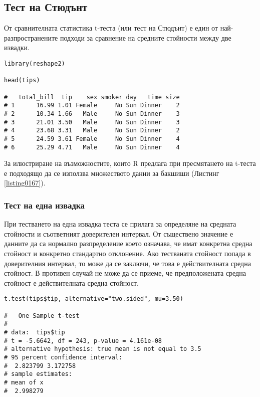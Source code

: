 \subsection{Тест на Стюдънт}

От сравнителната статистика t-теста (или тест на Стюдънт) е един от най-разпространените подходи за сравнение на средните стойности между две извадки. 

\begin{lstlisting}[caption=Тестово множество за бакшиши, label=listing0167]
library(reshape2)

head(tips)

#   total_bill  tip    sex smoker day   time size
# 1      16.99 1.01 Female     No Sun Dinner    2
# 2      10.34 1.66   Male     No Sun Dinner    3
# 3      21.01 3.50   Male     No Sun Dinner    3
# 4      23.68 3.31   Male     No Sun Dinner    2
# 5      24.59 3.61 Female     No Sun Dinner    4
# 6      25.29 4.71   Male     No Sun Dinner    4
\end{lstlisting}

За илюстриране на възможностите, които R предлага при пресмятането на t-теста е подходящо да се използва множеството данни за бакшиши (Листинг \ref{listing0167}).

\subsubsection{Тест на една извадка}

При тестването на една извадка теста се прилага за определяне на средната стойности и съответният доверителен интервал. От съществено значение е данните да са нормално разпределение което означава, че имат конкретна средна стойност и конкретно стандартно отклонение. Ако тестваната стойност попада в доверителния интервал, то може да се заключи, че това е действителната средна стойност. В противен случай не може да се приеме, че предположената средна стойност е действителната средна стойност. 

\begin{lstlisting}[caption=Тест на единична извадка, label=listing0168]
t.test(tips$tip, alternative="two.sided", mu=3.50)

# 	One Sample t-test
# 
# data:  tips$tip
# t = -5.6642, df = 243, p-value = 4.161e-08
# alternative hypothesis: true mean is not equal to 3.5
# 95 percent confidence interval:
#  2.823799 3.172758
# sample estimates:
# mean of x 
#  2.998279 
\end{lstlisting}

